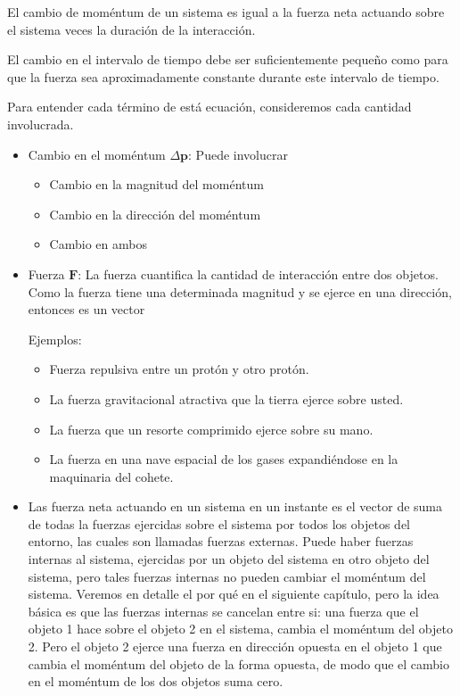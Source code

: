 El cambio de moméntum de un sistema es igual a la fuerza neta actuando sobre el sistema veces la duración de la interacción. 

El cambio en el intervalo de tiempo debe ser suficientemente pequeño como para que la fuerza sea aproximadamente constante durante este intervalo de tiempo.

Para entender cada término de está ecuación, consideremos cada cantidad involucrada. 
\begin{itemize}
\item Cambio en el moméntum $\Delta\mathbf{p}$: Puede involucrar
  \begin{itemize}
  \item Cambio en la magnitud del moméntum
  \item Cambio en la dirección del moméntum
  \item Cambio en ambos
  \end{itemize}
\item Fuerza $\mathbf{F}$: La fuerza cuantifica la cantidad de interacción entre dos objetos. Como la fuerza tiene una determinada magnitud y se ejerce en una dirección, entonces es un vector

Ejemplos:
\begin{itemize}
\item Fuerza repulsiva entre un protón y otro protón.
\item La fuerza gravitacional atractiva que la tierra ejerce sobre usted.
\item La fuerza que un resorte comprimido ejerce sobre su mano.
\item La fuerza en una nave espacial de los gases expandiéndose en la
  maquinaria del cohete.
\end{itemize}

\item Las fuerza neta actuando en un sistema en un instante es el vector de
suma de todas la fuerzas ejercidas sobre el sistema por todos los
objetos del entorno, las cuales son llamadas fuerzas externas. Puede
haber fuerzas internas al sistema, ejercidas por un objeto del sistema
en otro objeto del sistema, pero tales fuerzas internas no pueden
cambiar el moméntum del sistema. Veremos en detalle el por qué en
el siguiente capítulo, pero la idea básica es que las fuerzas internas
se cancelan entre si: una fuerza que el objeto 1 hace sobre el objeto
2 en el sistema, cambia el moméntum del objeto 2. Pero el objeto 2
ejerce una fuerza en dirección opuesta en el objeto 1 que cambia el
moméntum del objeto de la forma opuesta, de modo que el cambio en el
moméntum de los dos objetos suma cero. 

\end{itemize}




